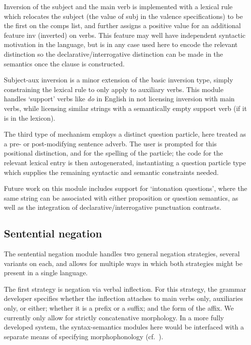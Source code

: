 \documentclass[11pt]{article}
\begin{document}

Inversion of the subject and the main verb is implemented with a lexical
rule which relocates the subject (the value of {\sc subj} in the valence
specifications) to be the first on the {\sc comps} list, and further
assigns a positive value for an additional feature {\sc inv} (inverted)
on verbs.  This feature may well have independent syntactic motivation in 
the language, but is in any case used here to encode the relevant distinction
so the declarative/interrogative distinction can be made in the semantics
once the clause is constructed.

Subject-aux inversion is a minor extension of the basic inversion
type, simply constraining the lexical rule to only apply to auxiliary
verbs.  This module handles `support' verbs like {\it do} in English
in not licensing inversion with main verbs, while
licensing similar strings with a semantically empty support verb
(if it is in the lexicon).  

The third type of mechanism employs a distinct question particle, here
treated as a pre- or post-modifying sentence adverb.  The user is
prompted for this positional distinction, and for the spelling of the
particle; the code for the relevant lexical entry is then
autogenerated, instantiating a question particle type which supplies
the remaining syntactic and semantic constraints needed.

Future work on this module includes support for `intonation questions',
where the same string can be associated with either proposition or question
semantics, as well as the integration of declarative/interrogative punctuation
contrasts.

\subsection{Sentential negation}

The sentential negation module handles two general negation strategies,
several variants on each, and allows for multiple ways in which both
strategies might be present in a single language.

The first strategy is negation via verbal inflection.  For this
strategy, the grammar developer specifies whether the
inflection attaches to main verbs only, auxiliaries only, or either; whether it is a prefix or a suffix; and the form of the affix.
We currently only allow
for strictly concatenative morphology.  In a more fully developed
system, the syntax-semantics modules here would be interfaced with a
separate means of specifying morphophonology (cf.\ \cite{Ben:Goo:05}).
\end{document}
